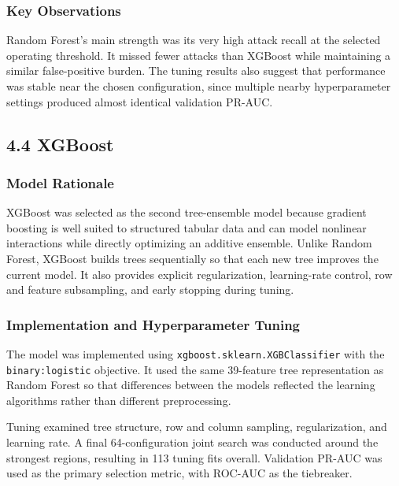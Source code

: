 \documentclass[
  canadian,
  12pt,
]{article}
\let\reportOrigSubsection\subsection
\renewcommand{\subsection}{\par\Needspace*{8\baselineskip}\reportOrigSubsection}%
\let\reportOrigSubsubsection\subsubsection
\renewcommand{\subsubsection}{\par\Needspace*{5\baselineskip}\reportOrigSubsubsection}%
\begin{document}
\subsubsection{Key Observations}\label{key-observations-2}

Random Forest's main strength was its very high attack recall at the
selected operating threshold. It missed fewer attacks than XGBoost while
maintaining a similar false-positive burden. The tuning results also
suggest that performance was stable near the chosen configuration, since
multiple nearby hyperparameter settings produced almost identical
validation PR-AUC.

\subsection[\texorpdfstring{\numberline{4.4}XGBoost}{4.4 XGBoost}]{4.4 XGBoost}\label{sec-4-4}

\subsubsection{Model Rationale}\label{model-rationale-3}

XGBoost was selected as the second tree-ensemble model because gradient
boosting is well suited to structured tabular data and can model
nonlinear interactions while directly optimizing an additive ensemble.
Unlike Random Forest, XGBoost builds trees sequentially so that each new
tree improves the current model. It also provides explicit
regularization, learning-rate control, row and feature subsampling, and
early stopping during tuning.

\subsubsection{Implementation and Hyperparameter
Tuning}\label{implementation-and-hyperparameter-tuning-3}

The model was implemented using \texttt{xgboost.\allowbreak{}sklearn.\allowbreak{}XGBClassifier}
with the \texttt{binary:logistic} objective. It used the same 39-feature
tree representation as Random Forest so that differences between the
models reflected the learning algorithms rather than different
preprocessing.

Tuning examined tree structure, row and column sampling, regularization,
and learning rate. A final 64-configuration joint search was conducted
around the strongest regions, resulting in 113 tuning fits overall.
Validation PR-AUC was used as the primary selection metric, with ROC-AUC
as the tiebreaker.
\end{document}
